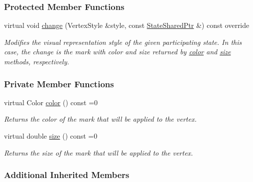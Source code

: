 \subsubsection*{Protected Member Functions}
\begin{DoxyCompactItemize}
\item 
virtual void \hyperlink{structslb_1_1ext_1_1event_1_1VertexEmphasis_a9908e46be39dbd4661382bb91da7d608}{change} (Vertex\+Style \&style, const \hyperlink{structslb_1_1ext_1_1event_1_1UniformChange_a2e6e9605dcd4df428c03c7637fd0d20d}{State\+Shared\+Ptr} \&) const override\hypertarget{structslb_1_1ext_1_1event_1_1VertexEmphasis_a9908e46be39dbd4661382bb91da7d608}{}\label{structslb_1_1ext_1_1event_1_1VertexEmphasis_a9908e46be39dbd4661382bb91da7d608}

\begin{DoxyCompactList}\small\item\em Modifies the visual representation style of the given participating state. In this case, the change is the mark with color and size returned by \hyperlink{structslb_1_1ext_1_1event_1_1VertexEmphasis_ac6913f25e6215fbecbc5369d7d9fedca}{color} and \hyperlink{structslb_1_1ext_1_1event_1_1VertexEmphasis_ae474f58607e671c9da688e316178c29c}{size} methods, respectively. \end{DoxyCompactList}\end{DoxyCompactItemize}
\subsubsection*{Private Member Functions}
\begin{DoxyCompactItemize}
\item 
virtual Color \hyperlink{structslb_1_1ext_1_1event_1_1VertexEmphasis_ac6913f25e6215fbecbc5369d7d9fedca}{color} () const =0
\begin{DoxyCompactList}\small\item\em Returns the color of the mark that will be applied to the vertex. \end{DoxyCompactList}\item 
virtual double \hyperlink{structslb_1_1ext_1_1event_1_1VertexEmphasis_ae474f58607e671c9da688e316178c29c}{size} () const =0
\begin{DoxyCompactList}\small\item\em Returns the size of the mark that will be applied to the vertex. \end{DoxyCompactList}\end{DoxyCompactItemize}
\subsubsection*{Additional Inherited Members}


